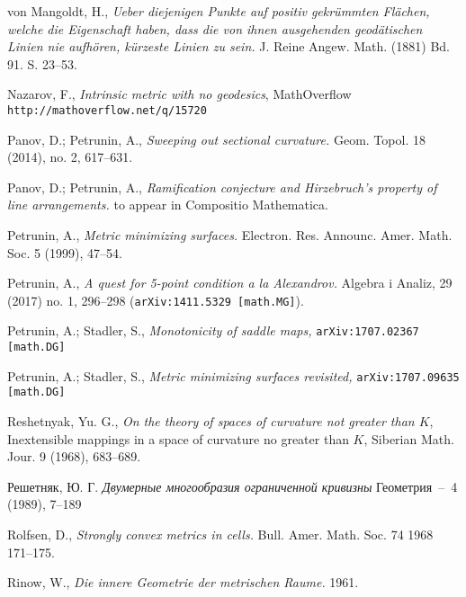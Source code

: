\begin{thebibliography}{52}
von Mangoldt, H., 
\textit{Ueber diejenigen Punkte auf positiv gekr\"ummten Fl\"achen, welche die Eigenschaft haben, dass die von ihnen ausgehenden geod\"atischen Linien nie aufh\"oren, k\"urzeste Linien zu sein.} 
J. Reine Angew. Math. (1881) Bd. 91. S. 23--53.

Nazarov, F.,
\textit{Intrinsic metric with no geodesics},
MathOverflow \texttt{http://mathoverflow.net/q/15720}

Panov, D.; Petrunin, A.,
\textit{Sweeping out sectional curvature.} 
Geom. Topol. 
18 
(2014), 
no. 2, 
617--631. 

Panov, D.; Petrunin, A.,
\textit{Ramification conjecture and Hirzebruch's property of line arrangements.}
to appear in Compositio Mathematica.

Petrunin, A.,
\textit{Metric minimizing surfaces.}
Electron. Res. Announc. Amer. Math. Soc. 
5 
(1999), 
47--54.

Petrunin, A.,
\textit{A quest for 5-point condition a la Alexandrov.}
Algebra i Analiz, 29 (2017) no. 1, 296--298
(\texttt{arXiv:1411.5329 [math.MG]}).



Petrunin, A.; 
Stadler, S., 
\textit{Monotonicity of saddle maps,}
\texttt{arXiv:1707.02367 [math.DG]}

Petrunin, A.; 
Stadler, S., 
\textit{Metric minimizing surfaces revisited,}
\texttt{arXiv:1707.09635 [math.DG]}

Reshetnyak, Yu. G.,
\textit{On the theory of spaces of curvature not greater than $K$},
Inextensible mappings in a space of curvature
no greater than $K$, Siberian Math. Jour. 9 (1968), 683--689.

\begin{otherlanguage}{russian}
Решетняк, Ю. Г.
\textit{Двумерные многообразия ограниченной кривизны}
Геометрия~--~4 (1989), 7--189
\end{otherlanguage}

Rolfsen, D.,
\textit{Strongly convex metrics in cells.}
Bull. Amer. Math. Soc. 74 1968 171–175.

Rinow, W., 
\textit{Die innere Geometrie der metrischen Raume.} 1961.


\end{thebibliography}
